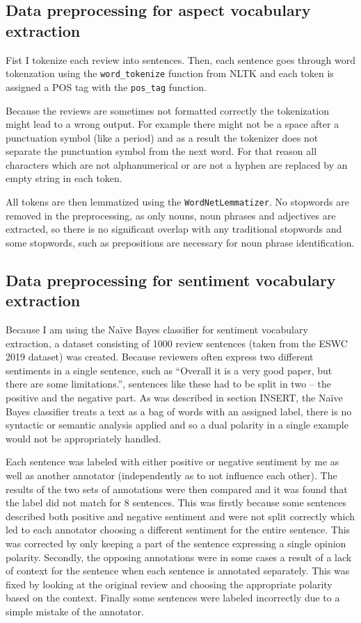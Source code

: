 \subsection{Data preprocessing for aspect vocabulary extraction}
Fist I tokenize each review into sentences. Then, each sentence goes through word tokenzation using the \texttt{word\_tokenize} function from NLTK and each token is assigned a POS tag with the \texttt{pos\_tag} function.

Because the reviews are sometimes not formatted correctly the tokenization might lead to a wrong output. For example there might not be a space after a punctuation symbol (like a period) and as a result the tokenizer does not separate the punctuation symbol from the next word. For that reason all characters which are not alphanumerical or are not a hyphen are replaced by an empty string in each token.

All tokens are then lemmatized using the \texttt{WordNetLemmatizer}. No stopwords are removed in the preprocessing, as only nouns, noun phrases and adjectives are extracted, so there is no significant overlap with any traditional stopwords and some stopwords, such as prepositions are necessary for noun phrase identification.
\subsection{Data preprocessing for sentiment vocabulary extraction}
Because I am using the Na\"ive Bayes classifier for sentiment vocabulary extraction, a dataset consisting of 1000 review sentences (taken from the ESWC 2019 dataset) was created. Because reviewers often express two different sentiments in a single sentence, such as ``Overall it is a very good paper, but there are some limitations.'', sentences like these had to be split in two -- the positive and the negative part. As was described in section INSERT, the Na\"ive Bayes classifier treats a text as a bag of words with an assigned label, there is no syntactic or semantic analysis applied and so a dual polarity in a single example would not be appropriately handled.

Each sentence was labeled with either positive or negative sentiment by me as well as another annotator (independently as to not influence each other). 
The results of the two sets of annotations were then compared and it was found that the label did not match for 8 sentences. This was firstly because some sentences described both positive and negative sentiment and were not split correctly which led to each annotator choosing a different sentiment for the entire sentence. This was corrected by only keeping a part of the sentence expressing a single opinion polarity. Secondly, the opposing annotations were in some cases a result of a lack of context for the sentence when each sentence is annotated separately. This was fixed by looking at the original review and choosing the appropriate polarity based on the context. Finally some sentences were labeled incorrectly due to a simple mistake of the annotator.

